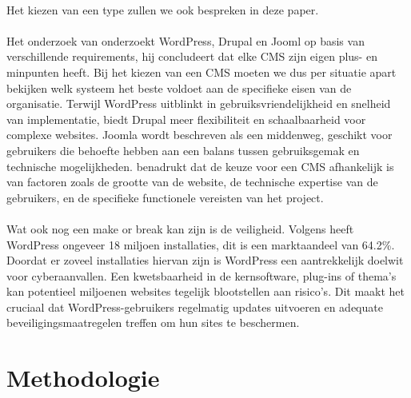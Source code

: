 \\
Het kiezen van een type zullen we ook bespreken in deze paper.
\\ \\
Het onderzoek van \textcite{Khalil2024} onderzoekt WordPress, Drupal en Jooml op basis van verschillende requirements, hij concludeert dat elke CMS zijn eigen plus- en minpunten heeft. Bij het kiezen van een CMS moeten we dus per situatie apart bekijken welk systeem het beste voldoet aan de specifieke eisen van de organisatie. Terwijl WordPress uitblinkt in gebruiksvriendelijkheid en snelheid van implementatie, biedt Drupal meer flexibiliteit en schaalbaarheid voor complexe websites. Joomla wordt beschreven als een middenweg, geschikt voor gebruikers die behoefte hebben aan een balans tussen gebruiksgemak en technische mogelijkheden. \textcite{Khalil2024} benadrukt dat de keuze voor een CMS afhankelijk is van factoren zoals de grootte van de website, de technische expertise van de gebruikers, en de specifieke functionele vereisten van het project.
\\ \\
Wat ook nog een make or break kan zijn is de veiligheid. Volgens \textcite{MarianVladut2021} heeft WordPress ongeveer 18 miljoen installaties, dit is een marktaandeel van 64.2\%. Doordat er zoveel installaties hiervan zijn is WordPress een aantrekkelijk doelwit voor cyberaanvallen. Een kwetsbaarheid in de kernsoftware, plug-ins of thema's kan potentieel miljoenen websites tegelijk blootstellen aan risico's. Dit maakt het cruciaal dat WordPress-gebruikers regelmatig updates uitvoeren en adequate beveiligingsmaatregelen treffen om hun sites te beschermen.


\section{Methodologie}%
\label{sec:methodologie}

